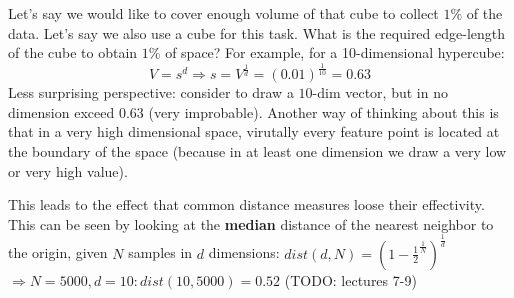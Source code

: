 \documentclass[a4paper]{article}
\begin{document}
Let's say we would like to cover enough volume of that cube to collect $1\%$ of the data. Let's say we also use a cube for this task. What is the required edge-length of the cube to obtain $1\%$ of space? For example, for a 10-dimensional hypercube:
\[V = s^d \Rightarrow s = V^{\frac{1}{d}} = (0.01)^{\frac{1}{10}} = 0.63\]
Less surprising perspective: consider to draw a $10$-dim vector, but in no dimension exceed $0.63$ (very improbable).
Another way of thinking about this is that in a very high dimensional space, virutally every feature point is located at the boundary of the space (because in at least one dimension we draw a very low or very high value).

This leads to the effect that common distance measures loose their effectivity. This can be seen by looking at the \textbf{median} distance of the nearest neighbor to the origin, given $N$ samples in $d$ dimensions: $dist(d, N) = (1 - \frac{1}{2}^{\frac{1}{N}})^{\frac{1}{d}}$\\
$\Rightarrow N=5000, d=10: dist(10, 5000) = 0.52$
(TODO: lectures 7-9)
\end{document}
